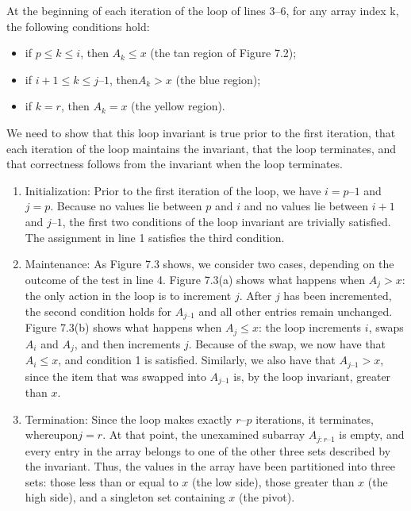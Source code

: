 At the beginning of each iteration of the loop of lines 3–6, for any array index k, the following conditions hold:
\begin{itemize}
  \item  if $p \le k \le i$, then $A_{k} \le x$ (the tan region of Figure 7.2);
  \item  if $i + 1 \le k \le j – 1$, then$ A_{k} > x$ (the blue region);
  \item  if $k = r$, then $A_{k} = x$ (the yellow region).
\end{itemize}
We need to show that this loop invariant is true prior to the first iteration, that each iteration of the loop maintains the invariant, that the loop terminates, and that correctness follows from the invariant when the loop terminates.

\begin{enumerate}
  \item Initialization: Prior to the first iteration of the loop, we have $i = p – 1$ and $ j= p$. Because no values lie between $p$ and $i$ and no values lie between $i + 1$ and $j – 1$, the first two conditions of the loop invariant are trivially satisfied. The assignment in line 1 satisfies the third condition.
  \item Maintenance: As Figure 7.3 shows, we consider two cases, depending on the outcome of the test in line 4. Figure 7.3(a) shows what happens when $A_{j} > x$: the only action in the loop is to increment $j$. After $j$  has been incremented, the second condition holds for $A_{j – 1}$ and all other entries remain unchanged. Figure 7.3(b) shows what happens when $A_{j} \le x$: the loop increments $i$, swaps $A_{i}$ and $A_{j}$, and then increments $j$. Because of the swap, we now have that $A_{i} \le x$, and condition 1 is satisfied. Similarly, we also have that $A_{j – 1} > x$, since the item that was swapped into $A_{j – 1}$ is, by the loop invariant, greater than $x$.
  \item Termination: Since the loop makes exactly $r – p$ iterations, it terminates, whereupon$ j= r$. At that point, the unexamined subarray $A_{j : r – 1}$ is empty, and every entry in the array belongs to one of the other three sets described by the invariant. Thus, the values in the array have been partitioned into three sets: those less than or equal to $x$ (the low side), those greater than $x$ (the high side), and a singleton set containing $x$ (the pivot).


\end{enumerate}



